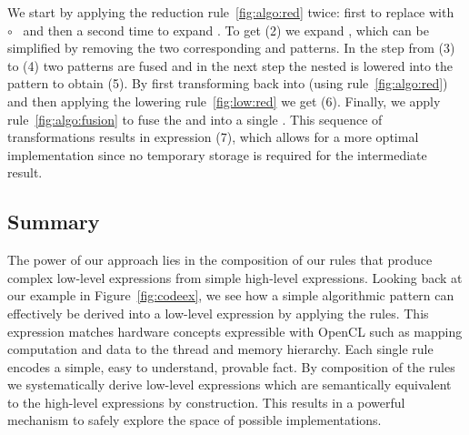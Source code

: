 We start by applying the reduction rule~\ref{fig:algo:red} twice:
first to replace  with ~$\circ$~ and then a second time to expand .
To get (2) we expand , which can be simplified by removing the two corresponding  and  patterns.
In the step from (3) to (4) two  patterns are fused and in the next step the nested  is lowered into the  pattern to obtain (5).
By first transforming  back into  (using rule~\ref{fig:algo:red}) and then applying the lowering rule~\ref{fig:low:red} we get (6).
Finally, we apply rule~\ref{fig:algo:fusion} to fuse the  and  into a single .
This sequence of transformations results in expression (7), which allows for a more optimal implementation since no temporary storage is required for the intermediate result.







\subsection{Summary}

The power of our approach lies in the composition of our rules that produce complex low-level expressions from simple high-level expressions.
Looking back at our example in Figure~\ref{fig:codeex}, we see how a simple algorithmic pattern can effectively be derived into a low-level expression by applying the rules.
This expression matches hardware concepts expressible with OpenCL such as mapping computation and data to the thread and memory hierarchy. %
Each single rule encodes a simple, easy to understand, provable fact.
By composition of the rules we systematically derive low-level expressions which are semantically equivalent to the high-level expressions by construction.
This results in a powerful mechanism to safely explore the space of possible implementations.

